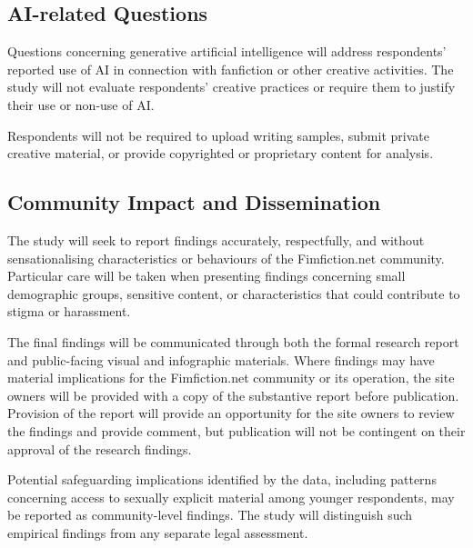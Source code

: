 \subsection{AI-related Questions}

Questions concerning generative artificial intelligence will address respondents' reported use of AI in connection with fanfiction or other creative activities. The study will not evaluate respondents' creative practices or require them to justify their use or non-use of AI.

Respondents will not be required to upload writing samples, submit private creative material, or provide copyrighted or proprietary content for analysis.

\subsection{Community Impact and Dissemination}

The study will seek to report findings accurately, respectfully, and without sensationalising characteristics or behaviours of the Fimfiction.net community. Particular care will be taken when presenting findings concerning small demographic groups, sensitive content, or characteristics that could contribute to stigma or harassment.

The final findings will be communicated through both the formal research report and public-facing visual and infographic materials. Where findings may have material implications for the Fimfiction.net community or its operation, the site owners will be provided with a copy of the substantive report before publication. Provision of the report will provide an opportunity for the site owners to review the findings and provide comment, but publication will not be contingent on their approval of the research findings.

Potential safeguarding implications identified by the data, including patterns concerning access to sexually explicit material among younger respondents, may be reported as community-level findings. The study will distinguish such empirical findings from any separate legal assessment.

